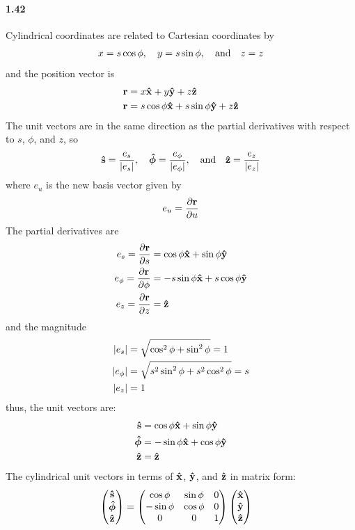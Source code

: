 \documentclass[../main.tex]{subfiles}
\begin{document}
\paragraph{1.42}
Cylindrical coordinates are related to Cartesian coordinates by
\begin{align*}
    x = s \cos\phi, \quad y = s \sin\phi, \qand z = z
\end{align*}
and the position vector is
\begin{align*}
    \vb{r} &= x \vu{x} + y \vu{y} + z \vu{z} \\
    \vb{r} &= s \cos\phi \vu{x} + s \sin\phi \vu{y} + z \vu{z}
\end{align*}
The unit vectors are in the same direction as the partial derivatives with respect to $s$, $\phi$,
and $z$, so
\begin{align*}
    \vu{s} = \frac{e_s}{\abs{e_s}}, \quad
    \vu*{\phi} = \frac{e_{\phi}}{\abs{e_{\phi}}}, \qand
    \vu{z} = \frac{e_{z}}{\abs{e_{z}}}
\end{align*}
where $e_u$ is the new basis vector given by
\begin{align*}
    e_u = \pdv{\vb{r}}{u}
\end{align*}
The partial derivatives are
\begin{align*}
    e_s = \pdv{\vb{r}}{s} &= \cos\phi \vu{x} + \sin\phi \vu{y} \\
    e_{\phi} = \pdv{\vb{r}}{\phi} &= -s \sin\phi \vu{x} + s \cos\phi \vu{y} \\
    e_{z} = \pdv{\vb{r}}{z} &= \vu{z}
\end{align*}
and the magnitude
\begin{align*}
    \abs{e_s} &= \sqrt{\cos^2\phi + \sin^2\phi} = 1 \\
    \abs{e_{\phi}} &= \sqrt{s^2 \sin^2\phi + s^2 \cos^2\phi} = s \\
    \abs{e_{z}} &= 1
\end{align*}
thus, the unit vectors are:
\begin{align*}
    \vu{s} &= \cos\phi \vu{x} + \sin\phi \vu{y} \\
    \vu*{\phi} &= -\sin\phi \vu{x} + \cos\phi \vu{y} \\
    \vu{z} &= \vu{z}
\end{align*}
The cylindrical unit vectors in terms of $\vu{x}$, $\vu{y}$, and $\vu{z}$ in matrix form:
\begin{align*}
    \mqty(
        \vu{s} \\
        \vu*{\phi} \\
        \vu{z}
    ) &=
    \begin{pmatrix}
        \cos\phi & \sin\phi & 0 \\
        -\sin\phi& \cos\phi & 0 \\
        0           & 0          & 1
    \end{pmatrix}
    \mqty(
        \vu{x} \\
        \vu{y} \\
        \vu{z}
    )
\end{align*}
\end{document}
